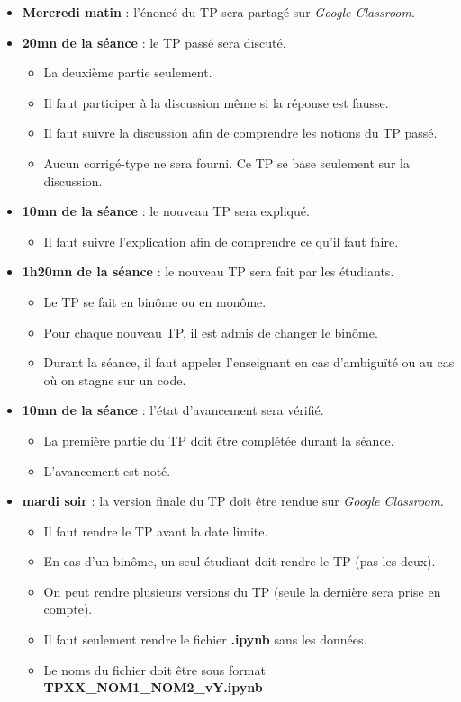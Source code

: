 \documentclass[11pt, a4paper]{article}
\begin{document}
\begin{itemize}
	\item \textbf{Mercredi matin} : l'énoncé du TP sera partagé sur \textit{Google Classroom}.
	
	\item \textbf{20mn de la séance} : le TP passé sera discuté.
	\begin{itemize}
		\item La deuxième partie seulement.
		\item Il faut participer à la discussion même si la réponse est fausse.
		\item Il faut suivre la discussion afin de comprendre les notions du TP passé.
		\item Aucun corrigé-type ne sera fourni. Ce TP se base seulement sur la discussion.
	\end{itemize}

	\item \textbf{10mn de la séance} : le nouveau TP sera expliqué.
	\begin{itemize}
		\item Il faut suivre l'explication afin de comprendre ce qu'il faut faire.
	\end{itemize}
	
	\item \textbf{1h20mn de la séance} : le nouveau TP sera fait par les étudiants.
	\begin{itemize}
		\item Le TP se fait en binôme ou en monôme.
		\item Pour chaque nouveau TP, il est admis de changer le binôme.
		\item Durant la séance, il faut appeler l'enseignant en cas d'ambiguïté ou au cas où on stagne sur un code.
	\end{itemize}

	\item \textbf{10mn de la séance} : l'état d'avancement sera vérifié.
	\begin{itemize}
		\item La première partie du TP doit être complétée durant la séance.
		\item L'avancement est noté.
	\end{itemize}

	\item \textbf{mardi soir} : la version finale du TP doit être rendue sur \textit{Google Classroom}.
	\begin{itemize}
		\item Il faut rendre le TP avant la date limite.
		\item En cas d'un binôme, un seul étudiant doit rendre le TP (pas les deux).
		\item On peut rendre plusieurs versions du TP (seule la dernière sera prise en compte).
		\item Il faut seulement rendre le fichier \textbf{.ipynb} sans les données.
		\item Le noms du fichier doit être sous format \textbf{TPXX\_NOM1\_NOM2\_vY.ipynb}
	\end{itemize}

\end{itemize}
\end{document}

